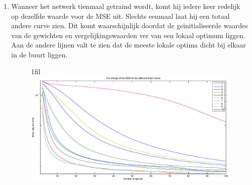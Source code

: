 \documentclass[a4paper,10pt,fleqn]{article}
\makeatletter
\newcommand*{\centerfloat}{%
  \parindent \z@
  \leftskip \z@ \@plus 1fil \@minus \textwidth
  \rightskip\leftskip
  \parfillskip \z@skip}
\makeatother
\begin{document}
\begin{enumerate}[1.]
	\item Wanneer het netwerk tienmaal getraind wordt, komt hij iedere keer redelijk op dezelfde waarde voor de MSE uit. Slechts eenmaal laat hij een totaal andere curve zien. Dit komt waarschijnlijk doordat de geïnitialiseerde waardes van de gewichten en vergelijkingswaarden ver van een lokaal optimum liggen. Aan de andere lijnen valt te zien dat de meeste lokale optima dicht bij elkaar in de buurt liggen.
    \begin{figure}[!ht]
    	\centerfloat
        \includegraphics[width=1.35\textwidth]{images/train-10-times-learning_rate}
    \end{figure}


\end{enumerate}
\end{document}
